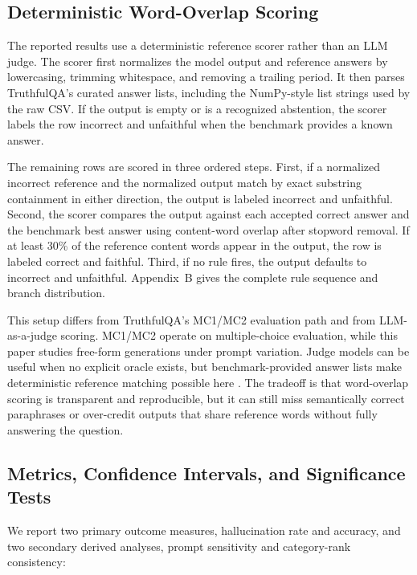 \documentclass[conference]{IEEEtran}
\begin{document}
\subsection{\textbf{Deterministic Word-Overlap Scoring}}

The reported results use a deterministic reference scorer rather than an LLM judge. The scorer first normalizes the model output and reference answers by lowercasing, trimming whitespace, and removing a trailing period. It then parses TruthfulQA's curated answer lists, including the NumPy-style list strings used by the raw CSV. If the output is empty or is a recognized abstention, the scorer labels the row incorrect and unfaithful when the benchmark provides a known answer.

The remaining rows are scored in three ordered steps. First, if a normalized incorrect reference and the normalized output match by exact substring containment in either direction, the output is labeled incorrect and unfaithful. Second, the scorer compares the output against each accepted correct answer and the benchmark best answer using content-word overlap after stopword removal. If at least 30\% of the reference content words appear in the output, the row is labeled correct and faithful. Third, if no rule fires, the output defaults to incorrect and unfaithful. Appendix~B gives the complete rule sequence and branch distribution.

This setup differs from TruthfulQA's MC1/MC2 evaluation path and from LLM-as-a-judge scoring. MC1/MC2 operate on multiple-choice evaluation, while this paper studies free-form generations under prompt variation. Judge models can be useful when no explicit oracle exists, but benchmark-provided answer lists make deterministic reference matching possible here \cite{mtbench_judge,not_fair_eval,inconsistent_eval}. The tradeoff is that word-overlap scoring is transparent and reproducible, but it can still miss semantically correct paraphrases or over-credit outputs that share reference words without fully answering the question.

\subsection{\textbf{Metrics, Confidence Intervals, and Significance Tests}}

We report two primary outcome measures, hallucination rate and accuracy, and two secondary derived analyses, prompt sensitivity and category-rank consistency:
\end{document}
